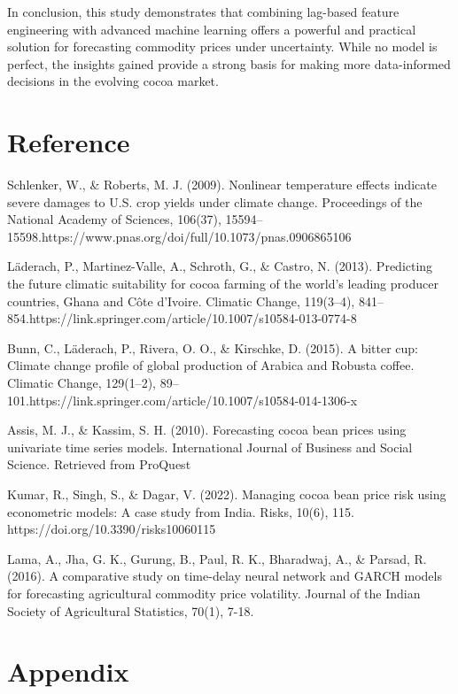\documentclass[
  letterpaper,
  DIV=11,
  numbers=noendperiod]{scrartcl}
\begin{document}
In conclusion, this study demonstrates that combining lag-based feature
engineering with advanced machine learning offers a powerful and
practical solution for forecasting commodity prices under uncertainty.
While no model is perfect, the insights gained provide a strong basis
for making more data-informed decisions in the evolving cocoa market.

\newpage

\hypertarget{reference}{%
\section{Reference}\label{reference}}

Schlenker, W., \& Roberts, M. J. (2009). Nonlinear temperature effects
indicate severe damages to U.S. crop yields under climate change.
Proceedings of the National Academy of Sciences, 106(37),
15594--15598.https://www.pnas.org/doi/full/10.1073/pnas.0906865106

Läderach, P., Martinez-Valle, A., Schroth, G., \& Castro, N. (2013).
Predicting the future climatic suitability for cocoa farming of the
world's leading producer countries, Ghana and Côte d'Ivoire. Climatic
Change, 119(3--4),
841--854.https://link.springer.com/article/10.1007/s10584-013-0774-8

Bunn, C., Läderach, P., Rivera, O. O., \& Kirschke, D. (2015). A bitter
cup: Climate change profile of global production of Arabica and Robusta
coffee. Climatic Change, 129(1--2),
89--101.https://link.springer.com/article/10.1007/s10584-014-1306-x

Assis, M. J., \& Kassim, S. H. (2010). Forecasting cocoa bean prices
using univariate time series models. International Journal of Business
and Social Science. Retrieved from ProQuest

Kumar, R., Singh, S., \& Dagar, V. (2022). Managing cocoa bean price
risk using econometric models: A case study from India. Risks, 10(6),
115. https://doi.org/10.3390/risks10060115

Lama, A., Jha, G. K., Gurung, B., Paul, R. K., Bharadwaj, A., \& Parsad,
R. (2016). A comparative study on time-delay neural network and GARCH
models for forecasting agricultural commodity price volatility. Journal
of the Indian Society of Agricultural Statistics, 70(1), 7-18.

\newpage
\appendix

\hypertarget{appendix}{%
\section{Appendix}\label{appendix}}
\end{document}
